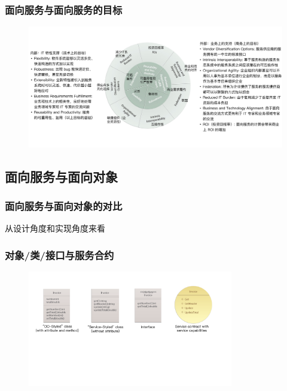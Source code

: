 \subsubsection{面向服务与面向服务的目标}
\begin{figure}[H]
    \vspace{-0.5em}
	\centering
	\includegraphics[width=\textwidth]{images/面向服务的目标.pdf}
    \vspace{-2em}
\end{figure}


\subsection{面向服务与面向对象}

\subsubsection{面向服务与面向对象的对比}


从设计角度和实现角度来看


\subsubsection{对象/类/接口与服务合约}
\begin{figure}[H]
    \vspace{-0.5em}
	\centering
	\includegraphics[width=0.8\textwidth]{images/对象、类、接口与服务合约.pdf}
    \vspace{-1em}
\end{figure}

